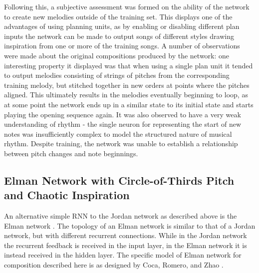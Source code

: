 \documentclass[ author={Stephen Livermore-Tozer},
				supervisor={Dr. Peter Flach},
				degree={MEng},
				title={Algorithmic Co-composition Using Machine Learning},
				subtitle={},
				type={research},
				year={2016} ]{dissertation}
\begin{document}
	Following this, a subjective assessment was formed on the ability of the network to create new melodies outside of the training set. This displays one of the advantages of using planning units, as by enabling or disabling different plan inputs the network can be made to output songs of different styles drawing inspiration from one or more of the training songs. A number of observations were made about the original compositions produced by the network: one interesting property it displayed was that when using a single plan unit it tended to output melodies consisting of strings of pitches from the corresponding training melody, but stitched together in new orders at points where the pitches aligned. This ultimately results in the melodies eventually beginning to loop, as at some point the network ends up in a similar state to its initial state and starts playing the opening sequence again. It was also observed to have a very weak understanding of rhythm - the single neuron for representing the start of new notes was insufficiently complex to model the structured nature of musical rhythm. Despite training, the network was unable to establish a relationship between pitch changes and note beginnings.
	
	\subsection{Elman Network with Circle-of-Thirds Pitch and Chaotic Inspiration}
	\label{sec:coca-net}
	
	An alternative simple RNN to the Jordan network as described above is the Elman network \cite{elman1990finding}. The topology of an Elman network is similar to that of a Jordan network, but with different recurrent connections. While in the Jordan network the recurrent feedback is received in the input layer, in the Elman network it is instead received in the hidden layer. The specific model of Elman network for composition described here is as designed by Coca, Romero, and Zhao \cite{coca2011generation}.
	
\end{document}
